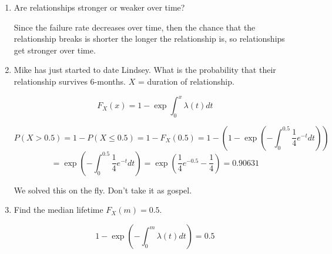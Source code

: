 \documentclass{article}
\begin{document}
\begin{enumerate}
\item Are relationships stronger or weaker over time?

Since the failure rate decreases over time, then the chance that the relationship breaks is shorter the longer the relationship is, so relationships get stronger over time.

\item Mike has just started to date Lindsey. What is the probability that their relationship survives 6-months. $X$ = duration of relationship.

$$F_X(x) = 1 - \exp{\int_0^x \lambda(t) dt}$$

$$ P(X > 0.5) = 1- P(X \leq 0.5) = 1 - F_X(0.5) = 1-(1-\exp(- \int_{0}^{0.5} \frac{1}{4} e^{-t} dt))$$ $$ = \exp(- \int_{0}^{0.5} \frac{1}{4} e^{-t} dt) = \exp(\frac{1}{4} e^{-0.5} - \frac{1}{4}) = 0.90631 $$ 

We solved this on the fly. Don't take it as gospel.

\item Find the median lifetime $F_X(m) = 0.5$.

$$1-\exp(- \int_{0}^{m} \lambda(t) dt) = 0.5$$
\end{enumerate}
\end{document}
